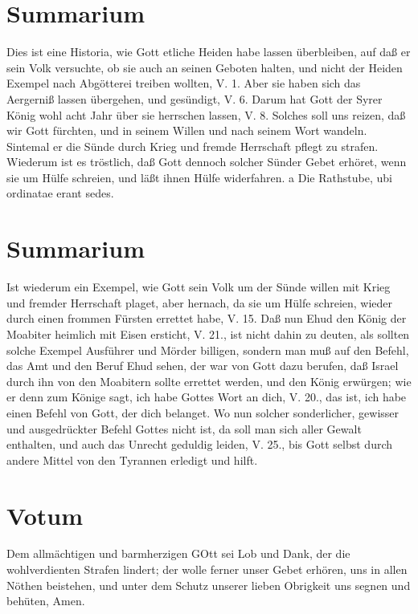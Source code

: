 \section{Summarium}

Dies ist eine Historia, wie Gott etliche Heiden habe lassen überbleiben, auf daß er sein Volk versuchte, ob sie auch an seinen Geboten halten, und nicht der Heiden Exempel nach Abgötterei treiben wollten, V. 1. Aber sie haben sich das Aergerniß lassen übergehen, und gesündigt, V. 6. Darum hat Gott der Syrer König wohl acht Jahr über sie herrschen lassen, V. 8. Solches soll uns reizen, daß wir Gott fürchten, und in seinem Willen und nach seinem Wort wandeln. Sintemal er die Sünde durch Krieg und fremde Herrschaft pflegt zu strafen. Wiederum ist es tröstlich, daß Gott dennoch solcher Sünder Gebet erhöret, wenn sie um Hülfe schreien, und läßt ihnen Hülfe widerfahren.
a Die Rathstube, ubi ordinatae erant sedes.

\section{Summarium}

Ist wiederum ein Exempel, wie Gott sein Volk um der Sünde willen mit Krieg und fremder Herrschaft plaget, aber hernach, da sie um Hülfe schreien, wieder durch einen frommen Fürsten errettet habe, V. 15. Daß nun Ehud den König der Moabiter heimlich mit Eisen ersticht, V. 21., ist nicht dahin zu deuten, als sollten solche Exempel Ausführer und Mörder billigen, sondern man muß auf den Befehl, das Amt und den Beruf Ehud sehen, der war von Gott dazu berufen, daß Israel durch ihn von den Moabitern sollte errettet werden, und den König erwürgen; wie er denn zum Könige sagt, ich habe Gottes Wort an dich, V. 20., das ist, ich habe einen Befehl von Gott, der dich belanget. Wo nun solcher sonderlicher, gewisser und ausgedrückter Befehl Gottes nicht ist, da soll man sich aller Gewalt enthalten, und auch das Unrecht geduldig leiden, V. 25., bis Gott selbst durch andere Mittel von den Tyrannen erledigt und hilft.

\section{Votum}

Dem allmächtigen und barmherzigen GOtt sei Lob und Dank, der die wohlverdienten Strafen lindert; der wolle ferner unser Gebet erhören, uns in allen Nöthen beistehen, und unter dem Schutz unserer lieben Obrigkeit uns segnen und behüten, Amen.


